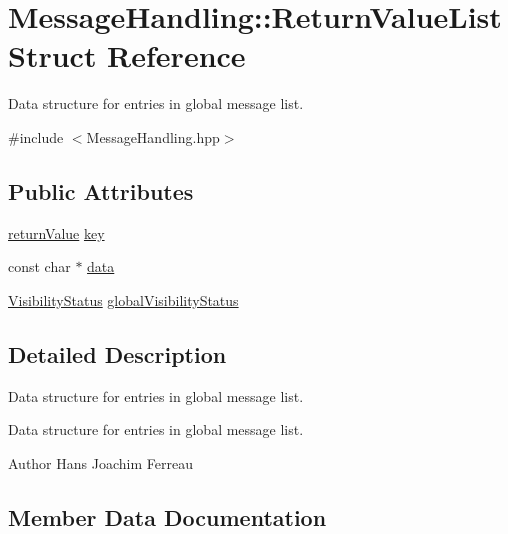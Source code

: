 \hypertarget{struct_message_handling_1_1_return_value_list}{}\section{Message\+Handling\+:\+:Return\+Value\+List Struct Reference}
\label{struct_message_handling_1_1_return_value_list}


Data structure for entries in global message list.  




{\ttfamily \#include $<$Message\+Handling.\+hpp$>$}

\subsection*{Public Attributes}
\begin{DoxyCompactItemize}
\item 
\hyperlink{_message_handling_8hpp_a81d556f613bfbabd0b1f9488c0fa865e}{return\+Value} \hyperlink{struct_message_handling_1_1_return_value_list_ad1a32761233ddf33b534717291c07cc0}{key}
\item 
const char $\ast$ \hyperlink{struct_message_handling_1_1_return_value_list_a5c222606c813d75a6cf46d68db507a60}{data}
\item 
\hyperlink{_types_8hpp_a36503475bb1fea0a7fd7087259ee63c1}{Visibility\+Status} \hyperlink{struct_message_handling_1_1_return_value_list_afb06de1c22ce41511753923ea8fa7542}{global\+Visibility\+Status}
\end{DoxyCompactItemize}


\subsection{Detailed Description}
Data structure for entries in global message list. 

Data structure for entries in global message list.

\begin{DoxyAuthor}{Author}
Hans Joachim Ferreau 
\end{DoxyAuthor}


\subsection{Member Data Documentation}
\mbox{\label{struct_message_handling_1_1_return_value_list_a5c222606c813d75a6cf46d68db507a60}} 
